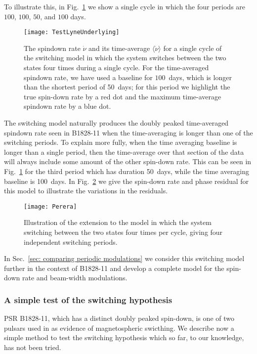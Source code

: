 To illustrate this, in Fig.~\ref{fig: test lyne underlying} we show a single
cycle in which the four periods are $100$, $100$, $50$, and $100$ days.
\begin{figure}[htb]
    \centering
    \texttt{[image: TestLyneUnderlying]}
    \caption{The spindown rate $\dot{\nu}$ and its time-average $\langle\dot{\nu}\rangle$
    for a single cycle of the \citet{Perera2014} switching model in which the
    system switches between the two states four times during a single cycle.
    For the time-averaged spindown rate, we have used a baseline for $100$~days,
    which is longer than the shortest period of 50~days; for this period we
    highlight the true spin-down rate by a red dot and the maximum time-average
    spindown rate by a blue dot.}
    \label{fig: test lyne underlying}
\end{figure}

The \citet{Perera2014} switching model naturally produces the doubly peaked
time-averaged spindown rate seen in B1828-11 when the time-averaging is longer
than one of the switching periods. To explain more fully, when the time
averaging baseline is longer than a single period, then the time-average over
that section of the data will always include some amount of the other spin-down
rate. This can be seen in Fig.~\ref{fig: test lyne underlying} for the third
period which has duration 50~days, while the time averaging baseline is
100~days. In Fig.~\ref{fig: perera example} we give the spin-down rate and
phase residual for this model to illustrate the variations in the residuals.
\begin{figure}[htb]
    \centering
    \texttt{[image: Perera]}
    \caption{Illustration of the \citet{Perera2014} extension to the
    \citet{Lyne2010} model in which the system switching between the two states
    four times per cycle, giving four independent switching periods.}
    \label{fig: perera example}
\end{figure}

In Sec.~\ref{sec: comparing periodic modulations} we consider this switching
model further in the context of B1828-11 and develop a complete model for the
spin-down rate and beam-width modulations.

\subsubsection{A simple test of the switching hypothesis}
PSR B1828-11, which has a distinct doubly peaked spin-down, is one of two pulsars
used in \citet{Lyne2010} as evidence of magnetospheric swicthing. We describe now
a simple method to test the switching hypothesis which so far, to our knowledge,
has not been tried.

